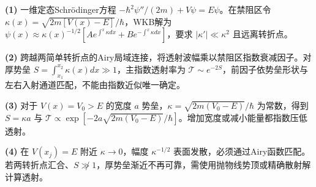 \par\noindent\textbf{(1)} 一维定态Schrödinger方程 \(-\hbar^2\psi''/(2m)+V\psi=E\psi\)。在禁阻区令 \(\kappa(x)=\sqrt{2m[V(x)-E]}/\hbar\)，WKB解为 \(\psi(x)\approx\kappa(x)^{-1/2}[A e^{\int^x\kappa dx}+B e^{-\int^x\kappa dx}]\)，要求 \(|\kappa'|\ll\kappa^2\) 且远离转折点。
\par\noindent\textbf{(2)} 跨越两简单转折点的Airy局域连接，将透射波幅乘以禁阻区指数衰减因子。对厚势垒 \(S=\int_{x_1}^{x_2}\kappa(x)dx\gg1\)，主指数透射率为 \(\mathcal T\sim e^{-2S}\)，前因子依势垒形状与左右入射通道匹配，不能由指数近似唯一确定。
\par\noindent\textbf{(3)} 对于 \(V(x)=V_0>E\) 的宽度 \(a\) 势垒，\(\kappa=\sqrt{2m(V_0-E)}/\hbar\) 为常数，得到 \(S=\kappa a\) 与 \(\mathcal T\propto\exp[-2a\sqrt{2m(V_0-E)}/\hbar]\)。增加宽度或减小能量都指数压低透射。
\par\noindent\textbf{(4)} 在 \(V(x_j)=E\) 附近 \(\kappa\to0\)，幅度 \(\kappa^{-1/2}\) 表面发散，必须通过Airy函数匹配。若两转折点汇合、\(S\not\gg1\)，厚势垒渐近不再可靠，需使用抛物线势顶或精确散射解计算透射。
